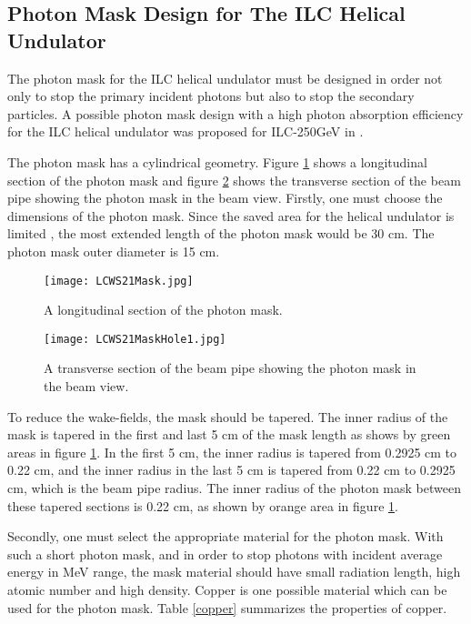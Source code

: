 \documentclass[a4paper]{article}
\begin{document}
\subsection{Photon Mask Design for The ILC Helical Undulator}
The photon mask for the ILC helical undulator must be designed in order not only to stop the primary incident photons but also to stop the secondary particles. A possible photon mask design with a high photon absorption efficiency for the ILC helical undulator was proposed for ILC-250GeV in \cite {IPAC21}. 

The photon mask has a cylindrical geometry. Figure \ref{fig:LCWS21Mask} shows a longitudinal section of the photon mask and  figure \ref{fig:LCWS21MaskHole1} shows the transverse section of the beam pipe showing the photon mask in the beam view. Firstly, one must choose the dimensions of the photon mask. Since the saved area for the helical undulator is limited \cite{TDR2018}, the most extended length of the photon mask would be 30 cm. The photon mask outer diameter is 15 cm. 




\begin{figure}[h]
\centering
\texttt{[image: LCWS21Mask.jpg]}
\caption{A longitudinal section of the photon mask.}
\label{fig:LCWS21Mask}
\end{figure}

 


\begin{figure}[h]
\centering
\texttt{[image: LCWS21MaskHole1.jpg]}
\caption{A transverse section of the beam pipe showing the photon mask in the beam view.}
\label{fig:LCWS21MaskHole1}
\end{figure}

To reduce the wake-fields, the mask should be tapered. The inner radius of the mask is tapered in the first and last 5 cm of the mask length as shows by green areas in figure \ref{fig:LCWS21Mask}. In the first 5 cm, the inner radius is tapered from 0.2925 cm to 0.22 cm, and the inner radius in the last 5 cm is tapered from 0.22 cm to 0.2925 cm, which is the beam pipe radius. The inner radius of the photon mask between these tapered sections is 0.22 cm, as shown by orange area in figure \ref{fig:LCWS21Mask}.







Secondly, one must select the appropriate material for the photon mask. With such a short photon mask, and in order to stop photons with incident average energy in MeV range, the mask material should have small radiation length, high atomic number and high density. Copper is one possible material which can be used for the photon mask. Table \ref{copper} summarizes the properties of copper.
\end{document}
